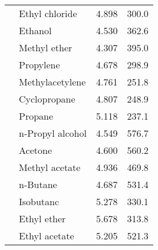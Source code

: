 \documentclass[\mainfilename]{subfiles}
\begin{document}
\begin{sectionBox}
\begin{center}
\begin{tabular}{l l CC}
            \\  & Ethyl chloride & 4.898 & 300.0
            \\  & Ethanol & 4.530 & 362.6
            \\  & Methyl ether & 4.307 & 395.0
            \\  & Propylene & 4.678 & 298.9
            \\  & Methylacetylene & 4.761 & 251.8
            \\  & Cyclopropane & 4.807 & 248.9
            \\  & Propane & 5.118 & 237.1
            \\  & n-Propyl alcohol & 4.549 & 576.7
            \\  & Acetone & 4.600 & 560.2
            \\  & Methyl acetate & 4.936 & 469.8
            \\  & n-Butane & 4.687 & 531.4
            \\  & Isobutanc & 5.278 & 330.1
            \\  & Ethyl ether & 5.678 & 313.8
            \\  & Ethyl acetate & 5.205 & 521.3
            
            \\\bottomrule
        \end{tabular}
        \\[1ex]
        \vspace{2ex}
    \end{center}
    
\end{sectionBox}
\end{document}
